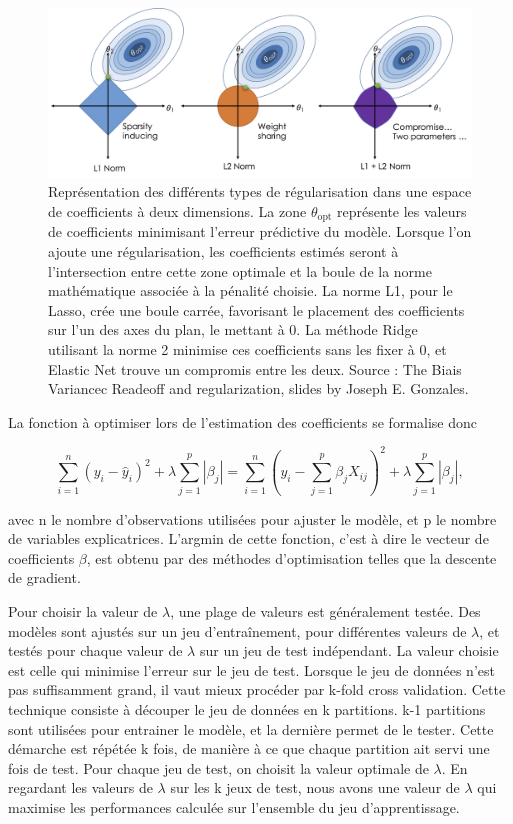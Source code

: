\documentclass[french]{llncs}
\begin{document}
\begin{figure}[h]
\begin{center}
 	\includegraphics[width=1\linewidth]{Images/Lasso-Ridge.png}
 \caption{Représentation des différents types de régularisation dans une espace de coefficients à deux dimensions. La zone $\theta_{\mathrm{opt}}$ représente les valeurs de coefficients minimisant l'erreur prédictive du modèle. Lorsque l'on ajoute une régularisation, les coefficients estimés seront à l'intersection entre cette zone optimale et la boule de la norme mathématique associée à la pénalité choisie. La norme L1, pour le Lasso, crée une boule carrée, favorisant le placement des coefficients sur l'un des axes du plan, le mettant à 0. La méthode Ridge utilisant la norme 2 minimise ces coefficients sans les fixer à 0, et Elastic Net trouve un compromis entre les deux. Source : The Biais Variancec Readeoff and regularization, slides by Joseph E. Gonzales.} \label{fig/lasso}
\end{center}
\end{figure}
La fonction à optimiser lors de l'estimation des coefficients se formalise donc

\begin{equation}
\sum_{i = 1}^{n}(y_i - \hat{y}_i)^2 + \lambda \sum_{j=1}^p|\beta_j| = \sum_{i = 1}^{n}(y_i - \sum_{j=1}^p\beta_jX_{ij})^2 + \lambda \sum_{j=1}^p|\beta_j|,
\end{equation}

avec n le nombre d'observations utilisées pour ajuster le modèle, et p le nombre de variables explicatrices. L'argmin de cette fonction, c'est à dire le vecteur de coefficients $\beta$, est obtenu par des méthodes d'optimisation telles que la descente de gradient.

Pour choisir la valeur de $\lambda$, une plage de valeurs est généralement testée. Des modèles sont ajustés sur un jeu d'entraînement, pour différentes valeurs de $\lambda$, et testés pour chaque valeur de $\lambda$ sur un jeu de test indépendant. La valeur choisie est celle qui minimise l'erreur sur le jeu de test. Lorsque le jeu de données n'est pas suffisamment grand, il vaut mieux procéder par k-fold cross validation. Cette technique consiste à découper le jeu de données en k partitions. k-1 partitions sont utilisées pour entrainer le modèle, et la dernière permet de le tester. Cette démarche est répétée k fois, de manière à ce que chaque partition ait servi une fois de test. Pour chaque jeu de test, on choisit la valeur optimale de $\lambda$. En regardant les valeurs de $\lambda$ sur les k jeux de test, nous avons une valeur de $\lambda$ qui maximise les performances calculée sur l'ensemble du jeu d'apprentissage.
\end{document}
